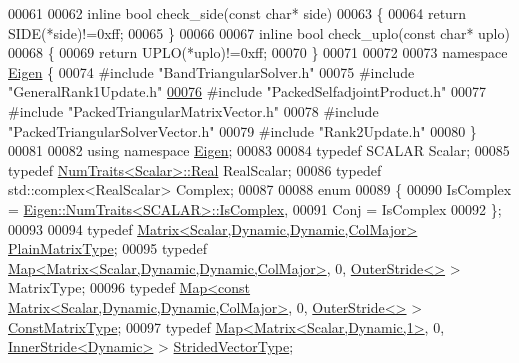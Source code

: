 \begin{DoxyCode}
00061 
00062 \textcolor{keyword}{inline} \textcolor{keywordtype}{bool} check\_side(\textcolor{keyword}{const} \textcolor{keywordtype}{char}* side)
00063 \{
00064   \textcolor{keywordflow}{return} SIDE(*side)!=0xff;
00065 \}
00066 
00067 \textcolor{keyword}{inline} \textcolor{keywordtype}{bool} check\_uplo(\textcolor{keyword}{const} \textcolor{keywordtype}{char}* uplo)
00068 \{
00069   \textcolor{keywordflow}{return} UPLO(*uplo)!=0xff;
00070 \}
00071 
00072 
00073 \textcolor{keyword}{namespace }\hyperlink{namespace_eigen}{Eigen} \{
00074 \textcolor{preprocessor}{#include "BandTriangularSolver.h"}
00075 \textcolor{preprocessor}{#include "GeneralRank1Update.h"}
\hyperlink{struct_eigen_1_1internal_1_1packed__triangular__solve__vector_3_01_lhs_scalar_00_01_rhs_scalar_0f79f386eb54adb50749a71b7ad7957d9}{00076} \textcolor{preprocessor}{#include "PackedSelfadjointProduct.h"}
00077 \textcolor{preprocessor}{#include "PackedTriangularMatrixVector.h"}
00078 \textcolor{preprocessor}{#include "PackedTriangularSolverVector.h"}
00079 \textcolor{preprocessor}{#include "Rank2Update.h"}
00080 \}
00081 
00082 \textcolor{keyword}{using namespace }\hyperlink{namespace_eigen}{Eigen};
00083 
00084 \textcolor{keyword}{typedef} SCALAR Scalar;
00085 \textcolor{keyword}{typedef} \hyperlink{group___core___module_struct_eigen_1_1_num_traits}{NumTraits<Scalar>::Real} RealScalar;
00086 \textcolor{keyword}{typedef} std::complex<RealScalar> Complex;
00087 
00088 \textcolor{keyword}{enum}
00089 \{
00090   IsComplex = \hyperlink{group___core___module_struct_eigen_1_1_num_traits}{Eigen::NumTraits<SCALAR>::IsComplex},
00091   Conj = IsComplex
00092 \};
00093 
00094 \textcolor{keyword}{typedef} \hyperlink{group___core___module_class_eigen_1_1_matrix}{Matrix<Scalar,Dynamic,Dynamic,ColMajor>} 
      \hyperlink{group___core___module_class_eigen_1_1_matrix}{PlainMatrixType};
00095 \textcolor{keyword}{typedef} \hyperlink{group___core___module_class_eigen_1_1_map}{Map<Matrix<Scalar,Dynamic,Dynamic,ColMajor>}, 0, 
      \hyperlink{class_eigen_1_1_outer_stride}{OuterStride<>} > MatrixType;
00096 \textcolor{keyword}{typedef} \hyperlink{group___core___module_class_eigen_1_1_map}{Map<const Matrix<Scalar,Dynamic,Dynamic,ColMajor>},
       0, \hyperlink{class_eigen_1_1_outer_stride}{OuterStride<>} > \hyperlink{group___core___module_class_eigen_1_1_map}{ConstMatrixType};
00097 \textcolor{keyword}{typedef} \hyperlink{group___core___module_class_eigen_1_1_map}{Map<Matrix<Scalar,Dynamic,1>}, 0, 
      \hyperlink{class_eigen_1_1_inner_stride}{InnerStride<Dynamic>} > \hyperlink{group___core___module_class_eigen_1_1_map}{StridedVectorType};

\end{DoxyCode}
